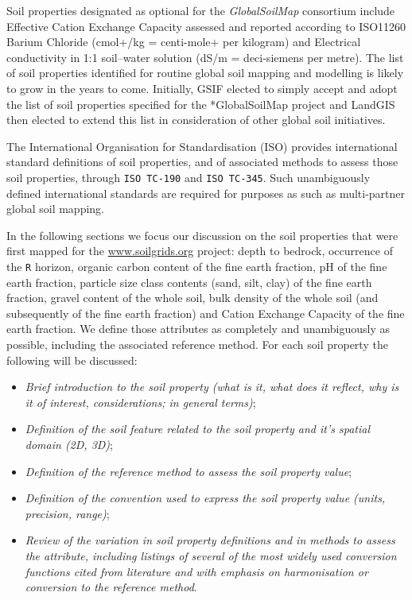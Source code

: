 \documentclass[graybox,natbib,nospthms,UStrade]{svmono}
\begin{document}
Soil properties designated as optional for the \emph{GlobalSoilMap}
consortium include Effective Cation Exchange Capacity assessed and
reported according to ISO11260 Barium Chloride (cmol+/kg = centi-mole+ per kilogram)
and Electrical conductivity in 1:1 soil--water solution (dS/m = deci-siemens per metre).
The list of soil properties identified for routine global soil mapping and
modelling is likely to grow in the years to come. Initially,
GSIF elected to simply accept and adopt the list of soil properties
specified for the *GlobalSoilMap project and LandGIS then elected to extend
this list in consideration of other global soil initiatives.

The International Organisation for Standardisation (ISO) provides
international standard definitions of soil properties, and of associated
methods to assess those soil properties, through \texttt{ISO\ TC-190} and
\texttt{ISO\ TC-345}. Such unambiguously defined international standards are
required for purposes as such as multi-partner global soil mapping.

In the following sections we focus our discussion on the soil properties
that were first mapped for the \url{www.soilgrids.org} project:
depth to bedrock, occurrence of the \texttt{R} horizon, organic carbon content of the fine earth
fraction, pH of the fine earth fraction, particle size class contents
(sand, silt, clay) of the fine earth fraction, gravel content of the
whole soil, bulk density of the whole soil (and subsequently of the fine
earth fraction) and Cation Exchange Capacity of the fine earth fraction.
We define those attributes as completely and unambiguously as possible,
including the associated reference method. For each soil property the
following will be discussed:

\begin{itemize}
\item
  \emph{Brief introduction to the soil property (what is it, what does it
  reflect, why is it of interest, considerations; in general terms)};
\item
  \emph{Definition of the soil feature related to the soil property and
  it's spatial domain (2D, 3D)};
\item
  \emph{Definition of the reference method to assess the soil property
  value};
\item
  \emph{Definition of the convention used to express the soil property value
  (units, precision, range)};
\item
  \emph{Review of the variation in soil property definitions and in methods
  to assess the attribute, including listings of several of the most
  widely used conversion functions cited from literature and with
  emphasis on harmonisation or conversion to the reference method}.
\end{itemize}
\end{document}
